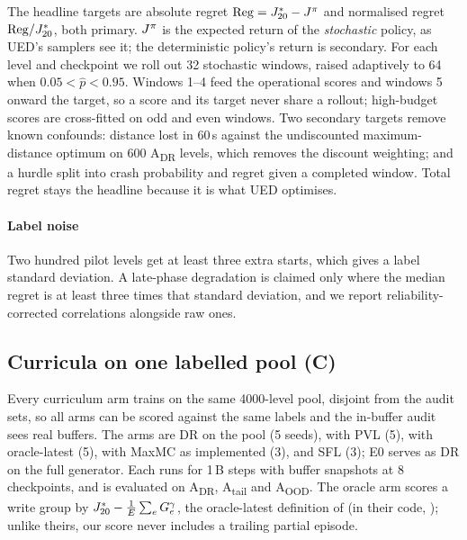 The headline targets are absolute regret $\mathrm{Reg} = J^{*}_{20} - J^{\pi}$ and normalised regret
$\mathrm{Reg}/J^{*}_{20}$, both primary. $J^{\pi}$ is the expected return of the \emph{stochastic}
policy, as UED's samplers see it; the deterministic policy's return is secondary.
For each level and checkpoint we roll out 32 stochastic windows, raised adaptively to 64
when $0.05 < \hat p < 0.95$. Windows 1--4 feed the operational scores and windows 5 onward
the target, so a score and its target never share a rollout; high-budget scores are
cross-fitted on odd and even windows.
Two secondary targets remove known confounds: distance lost in 60\,s against the
undiscounted maximum-distance optimum on 600 A\textsubscript{DR} levels, which removes the
discount weighting; and a hurdle split into crash probability and regret given a
completed window. Total regret stays the headline because it is what UED optimises.

\paragraph{Label noise} Two hundred pilot levels get at least three extra starts, which
gives a label standard deviation. A late-phase degradation is claimed only where the
median regret is at least three times that standard deviation, and we report
reliability-corrected correlations alongside raw ones.

\subsection{Curricula on one labelled pool (C)}
\label{sec:protocol-c}

Every curriculum arm trains on the same \num{4000}-level pool, disjoint from the audit sets,
so all arms can be scored against the same labels and the in-buffer audit sees real
buffers. The arms are DR on the pool (5 seeds), \PLRp{} with PVL (5), \PLRp{} with
oracle-latest (5), \PLRp{} with MaxMC as implemented (3), and SFL (3); E0 serves as DR on
the full generator. Each runs for 1\,B steps with buffer snapshots at 8 checkpoints, and is
evaluated on A\textsubscript{DR}, A\textsubscript{tail} and A\textsubscript{OOD}.
The oracle arm scores a write group by $J^{*}_{20} - \frac{1}{E}\sum_e G^\gamma_e$, the
oracle-latest definition of \citet{abdelsadek2025goal} (in their code, );
unlike theirs, our score never includes a trailing partial episode.

